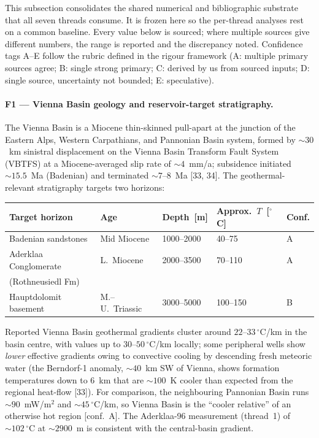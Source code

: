 \documentclass{article}
\begin{document}
This subsection consolidates the shared numerical and bibliographic
substrate that all seven threads consume. It is frozen here so the
per-thread analyses rest on a common baseline. Every value below
is sourced; where multiple sources give different numbers, the range
is reported and the discrepancy noted. Confidence tags A--E follow
the rubric defined in the rigour framework
(A: multiple primary sources agree; B: single strong primary;
C: derived by us from sourced inputs; D: single source, uncertainty
not bounded; E: speculative).

\paragraph{F1 --- Vienna Basin geology and reservoir-target stratigraphy.}
The Vienna Basin is a Miocene thin-skinned pull-apart at the junction of
the Eastern Alps, Western Carpathians, and Pannonian Basin system,
formed by $\sim 30$~km sinistral displacement on the Vienna Basin
Transform Fault System (VBTFS) at a Miocene-averaged slip rate of
$\sim 4$~mm/a; subsidence initiated $\sim 15.5$~Ma (Badenian) and
terminated $\sim 7$--$8$~Ma [33, 34]. The geothermal-relevant
stratigraphy targets two horizons:

\begin{center}
\begin{tabular}{lllll}
\hline
\textbf{Target horizon} & \textbf{Age} & \textbf{Depth~[m]} & \textbf{Approx.\ $T$~[$^\circ$C]} & \textbf{Conf.} \\
\hline
Badenian sandstones    & Mid Miocene & 1000--2000 & 40--75   & A \\
Aderklaa Conglomerate  & L.\ Miocene & 2000--3500 & 70--110  & A \\
(Rothneusiedl Fm)      &             &            &          &   \\
Hauptdolomit basement  & M.--U.\ Triassic & 3000--5000 & 100--150 & B \\
\hline
\end{tabular}
\end{center}

Reported Vienna Basin geothermal gradients cluster around
$22$--$33\,^\circ$C/km in the basin centre, with values up to
$30$--$50\,^\circ$C/km locally; some peripheral wells show
\emph{lower} effective gradients owing to convective cooling by
descending fresh meteoric water (the Berndorf-1 anomaly,
$\sim 40$~km SW of Vienna, shows formation temperatures down to
6~km that are $\sim 100$~K cooler than expected from the regional
heat-flow [33]). For comparison, the neighbouring Pannonian Basin runs
$\sim 90$~mW/m$^2$ and $\sim 45\,^\circ$C/km, so Vienna Basin is the
``cooler relative'' of an otherwise hot region [conf.\ A]. The
Aderklaa-96 measurement (thread~1) of $\sim 102\,^\circ$C at
$\sim 2900$~m is consistent with the central-basin gradient.
\end{document}
